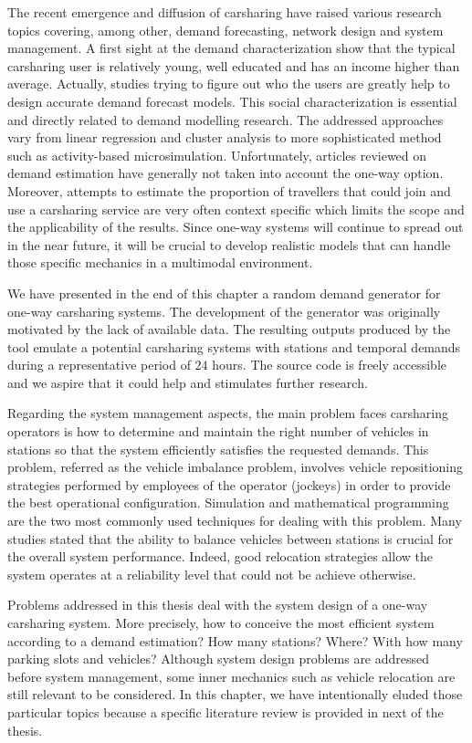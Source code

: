 \begin{bibunit}[ieeetr]
\medskip
The recent emergence and diffusion of carsharing have raised various research topics covering, among other, demand forecasting, network design and system management.
A first sight at the demand characterization show that the typical carsharing user is relatively young, well educated and has an income higher than average.
Actually, studies trying to figure out who the users are greatly help to design accurate demand forecast models.
This social characterization is essential and directly related to demand modelling research.
The addressed approaches vary from linear regression and cluster analysis to more sophisticated method such as activity-based microsimulation.
Unfortunately, articles reviewed on demand estimation have generally not taken into account the one-way option.
Moreover, attempts to estimate the proportion of travellers that could join and use a carsharing service are very often context specific which limits the scope and the applicability of the results.
Since one-way systems will continue to spread out in the near future, it will be crucial to develop realistic models that can handle those specific mechanics in a multimodal environment.

We have presented in the end of this chapter a random demand generator for one-way carsharing systems.
The development of the generator was originally motivated by the lack of available data.
The resulting outputs produced by the tool emulate a potential carsharing systems with stations and temporal demands during a representative period of $24$ hours.
The source code is freely accessible \cite{csgen} and we aspire that it could help and stimulates further research.


\medskip
Regarding the system management aspects, the main problem faces carsharing operators is how to determine and maintain the right number of vehicles in stations so that the system efficiently satisfies the requested demands.
This problem, referred as the vehicle imbalance problem, involves vehicle repositioning strategies performed by employees of the operator (jockeys) in order to provide the best operational configuration.
Simulation and mathematical programming are the two most commonly used techniques for dealing with this problem.
Many studies stated that the ability to balance vehicles between stations is crucial for the overall system performance.
Indeed, good relocation strategies allow the system operates at a reliability level that could not be achieve otherwise.


\medskip
Problems addressed in this thesis deal with the system design of a one-way carsharing system.
More precisely, how to conceive the most efficient system according to a demand estimation?
How many stations?
Where?
With how many parking slots and vehicles?
Although system design problems are addressed before system management, some inner mechanics such as vehicle relocation are still relevant to be considered.
In this chapter, we have intentionally eluded those particular topics because a specific literature review is provided in next of the thesis.


\end{bibunit}
